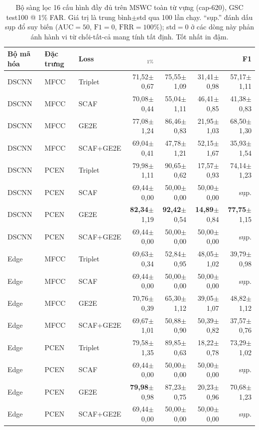 \documentclass[12pt,a4paper]{report}
\newcommand{\acc}{\text{ACC}}
\newcommand{\frr}{\text{FRR}}
\newcommand{\eer}{\text{EER}}
\newcommand{\auc}{\text{AUC}}
\newcommand{\best}[1]{\textbf{#1}}
\begin{document}
\begin{table}[H]
\centering
\caption{Bộ sàng lọc 16 cấu hình đầy đủ trên MSWC toàn từ vựng (cap-620),
GSC test100 @ 1\% FAR. Giá trị là trung bình$\pm$std qua 100 lần chạy.
``sụp.'' đánh dấu sụp đổ suy biến ($\auc{=}50$, $\text{F1}{=}0$, $\frr{=}100\%$);
std$=0$ ở các dòng này phản ánh hành vi từ chối-tất-cả mang tính tất định. Tốt
nhất in đậm.}
\label{tab:matrix}
\scriptsize
\setlength{\tabcolsep}{3pt}
\begin{tabular}{lll r r r r}
\toprule
\textbf{Bộ mã hóa} & \textbf{Đặc trưng} & \textbf{Loss} &
\acc$_{1\%}$ & \auc & \eer & F1\\
\midrule
DSCNN & MFCC & Triplet     & 71{,}52$\pm$0{,}67 & 75{,}55$\pm$1{,}09 & 31{,}41$\pm$0{,}98 & 57{,}17$\pm$1{,}11 \\
DSCNN & MFCC & SCAF        & 70{,}08$\pm$0{,}44 & 55{,}04$\pm$1{,}11 & 46{,}41$\pm$0{,}85 & 41{,}38$\pm$0{,}83 \\
DSCNN & MFCC & GE2E        & 77{,}08$\pm$1{,}24 & 86{,}46$\pm$0{,}83 & 21{,}95$\pm$1{,}03 & 68{,}50$\pm$1{,}30 \\
DSCNN & MFCC & SCAF+GE2E   & 69{,}04$\pm$0{,}41 & 47{,}78$\pm$1{,}21 & 52{,}15$\pm$1{,}67 & 35{,}93$\pm$1{,}54 \\
DSCNN & PCEN & Triplet     & 79{,}98$\pm$1{,}11 & 90{,}65$\pm$0{,}62 & 17{,}57$\pm$0{,}93 & 74{,}14$\pm$1{,}23 \\
DSCNN & PCEN & SCAF        & 69{,}44$\pm$0{,}00 & 50{,}00$\pm$0{,}00 & 50{,}00$\pm$0{,}00 & sụp. \\
\rowcolor{blue!7}
DSCNN & PCEN & GE2E        & \best{82{,}34}$\pm$1{,}19 & \best{92{,}42}$\pm$0{,}54 & \best{14{,}89}$\pm$0{,}84 & \best{77{,}75}$\pm$1{,}15 \\
DSCNN & PCEN & SCAF+GE2E   & 69{,}44$\pm$0{,}00 & 50{,}00$\pm$0{,}00 & 50{,}00$\pm$0{,}00 & sụp. \\
Edge  & MFCC & Triplet     & 69{,}63$\pm$0{,}34 & 52{,}84$\pm$0{,}95 & 48{,}05$\pm$1{,}02 & 39{,}79$\pm$0{,}98 \\
Edge  & MFCC & SCAF        & 69{,}44$\pm$0{,}00 & 50{,}00$\pm$0{,}00 & 50{,}00$\pm$0{,}00 & sụp. \\
Edge  & MFCC & GE2E        & 70{,}76$\pm$0{,}39 & 65{,}30$\pm$1{,}12 & 39{,}05$\pm$1{,}07 & 48{,}82$\pm$1{,}12 \\
Edge  & MFCC & SCAF+GE2E   & 69{,}67$\pm$1{,}01 & 50{,}88$\pm$0{,}90 & 50{,}39$\pm$0{,}82 & 37{,}57$\pm$0{,}76 \\
Edge  & PCEN & Triplet     & 79{,}58$\pm$1{,}35 & 89{,}85$\pm$0{,}63 & 18{,}22$\pm$0{,}78 & 73{,}29$\pm$1{,}02 \\
Edge  & PCEN & SCAF        & 69{,}44$\pm$0{,}00 & 50{,}00$\pm$0{,}00 & 50{,}00$\pm$0{,}00 & sụp. \\
\rowcolor{blue!7}
Edge  & PCEN & GE2E        & \best{79{,}98}$\pm$0{,}98 & 87{,}23$\pm$0{,}75 & 20{,}23$\pm$0{,}96 & 70{,}68$\pm$1{,}23 \\
Edge  & PCEN & SCAF+GE2E   & 69{,}44$\pm$0{,}00 & 50{,}00$\pm$0{,}00 & 50{,}00$\pm$0{,}00 & sụp. \\
\bottomrule
\end{tabular}
\end{table}
\end{document}
